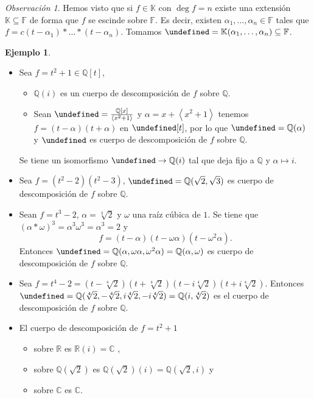 \documentclass[10pt, spanish]{report}
\theoremstyle{definition}
\newtheorem*{ej}{Ejemplo}
\theoremstyle{custom}
\theoremstyle{remark}
\newtheorem*{obs}{Observación}
\newcommand{\Q}{\mathbb{Q}}
\newcommand{\R}{\mathbb{R}}
\newcommand{\C}{\mathbb{C}}
\newcommand{\F}{\mathbb{F}}
\newcommand{\K}{\mathbb{K}}
\let\L\undefined
\newcommand{\L}{\mathbb{L}}
\begin{document}
\begin{obs}
    Hemos visto que si $f\in\K$ con $\deg{f}=n$ existe una extensión
    $\K\subseteq\F$ de forma que $f$ se escinde sobre $\F$. Es decir, existen
    $\alpha_1,\ldots,\alpha_n\in \F$ tales que
    $f=c(t-\alpha_1)*\ldots*(t-\alpha_n)$. Tomamos
    $\L=\K(\alpha_1,\ldots,\alpha_n)\subseteq\F$.
\end{obs}

\begin{ej}\hspace{0pt}
    \begin{itemize}
        \item Sea $f=t^2+1\in\Q[t]$,
            \begin{itemize}
                \item $\Q(i)$ es un cuerpo de descomposición de $f$ sobre $\Q$.
                \item Sean $\L=\frac{\Q[x]}{\left<x^2+1\right>}$ y $\alpha=x+\left<
                    x^2+1\right>$ tenemos $f=(t-\alpha)(t+\alpha)$ en $\L[t]$, por lo
                    que $\L=\Q(\alpha)$ y $\L$ es cuerpo de descomposición de $f$ sobre
                    $\Q$.
            \end{itemize}
            Se tiene un isomorfismo $\L\to\Q(i)$ tal que deja fijo a $\Q$ y
            $\alpha\mapsto i$.
        \item Sea $f=(t^2-2)(t^2-3)$, $\L=\Q(\sqrt{2},\sqrt{3})$ es cuerpo de
            descomposición de $f$ sobre $\Q$.
        \item Sean $f=t^3-2$, $\alpha =\sqrt[3]{2}$ y $\omega$ una raíz cúbica
            de $1$. Se tiene que $(\alpha*\omega)^3=\alpha^3\omega^3=\alpha^3=2$
            y \[f=(t-\alpha)(t-\omega\alpha)(t-\omega^2\alpha).\] Entonces
            $\L=\Q(\alpha,\omega\alpha,\omega^2\alpha)=\Q(\alpha,\omega)$ es
            cuerpo de descomposición de $f$ sobre $\Q$.
        \item Sea $f=t^4-2=(t-\sqrt[4]{2})(t+\sqrt[4]{2})(t-i\sqrt[4]{2})
            (t+i\sqrt[4]{2})$. Entonces
            $\L=\Q(\sqrt[4]{2},-\sqrt[4]{2},i\sqrt[4]{2},-i\sqrt[4]{2})=\Q(i,\sqrt[4]{2})$
            es el cuerpo de descomposición de $f$ sobre $\Q$.
        \item El cuerpo de descomposición de $f=t^2+1$
            \begin{itemize}
                \item sobre $\R$ es $\R(i)=\C$ ,
                \item sobre $\Q(\sqrt{2})$ es $\Q(\sqrt{2})(i)=\Q(\sqrt{2},i)$ y
                \item sobre $\C$ es $\C$.
            \end{itemize}
    \end{itemize}
\end{ej}
\end{document}
